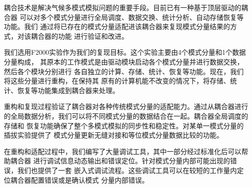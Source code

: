 
\begin{cabstract}
  耦合技术是解决气候多模式模拟问题的重要手段。目前已有一种基于顶层驱动的耦合器
  可以对多个模式分量进行全局调度、数据交换、统计分析、自动存储恢复等功能。我们
  通过将已存在的模式分量适配进该耦合器来复现模式分量结果的方式，对该耦合器的功能
  进行验证和改进。
  
  我们选用F2000实验作为我们的复现目标。这个实验主要由4个模式分量和1个数据分量构成，
  其原本的工作模式是由驱动模块启动各个模式分量并进行数据交换，然后各个模块分别进行
  各自独立的计算、存储、统计、恢复等功能。现在，我们将这些分量进行重构，在保持其
  原有的计算机能不改变的情况下，将存储、统计、恢复等功能集成到耦合器来处理。

  重构和复现过程验证了耦合器对各种传统模式分量的适配能力。通过从耦合器进行
  的全局数据分析，我们可以将不同模式分量的数据结合在一起。耦合器全局调度的存储和
  恢复功能确保了整个多模式模拟的同步性和稳定性。对某单一模式分量的插拔实验提供了
  模式分量更新无缝对接和等位模式分量数据比较的功能。

  在重构和适配过程中，我们编写了大量调试工具，其中一部分经过标准化后可以帮助耦合器
  进行调试信息动态输出和错误定位。针对模式分量内部可能出现的错误，我们也提供了一套
  嵌入式调试流程。这些调试工具可以在较短的工作量内定位耦合器配置错误或是确认模式
  分量内部错误。

\end{cabstract}

